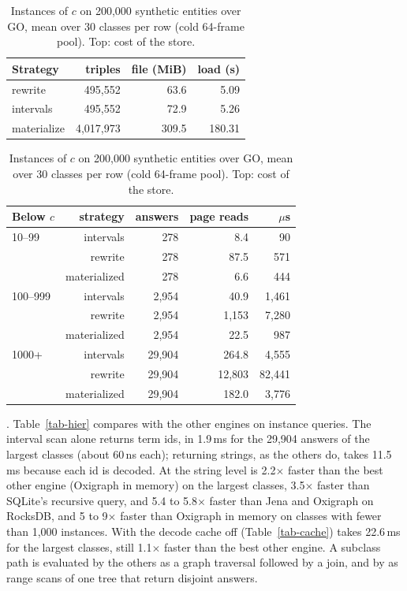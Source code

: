 \begin{table}[t]
\caption{Instances of $c$ on 200,000 synthetic entities over GO, mean over 30 classes per row (cold 64-frame pool). Top: cost of the store.}
\label{tab-types}
\small
\begin{tabular}{@{}lrrr@{}}
\toprule
Strategy & triples & file (MiB) & load (s) \\
\midrule
rewrite & 495,552 & 63.6 & 5.09 \\
intervals & 495,552 & 72.9 & 5.26 \\
materialize & 4,017,973 & 309.5 & 180.31 \\
\bottomrule
\end{tabular}

\medskip
\begin{tabular}{@{}lrrrr@{}}
\toprule
Below $c$ & strategy & answers & page reads & $\mu$s \\
\midrule
10--99 & intervals & 278 & 8.4 & 90 \\
 & rewrite & 278 & 87.5 & 571 \\
 & materialized & 278 & 6.6 & 444 \\
100--999 & intervals & 2,954 & 40.9 & 1,461 \\
 & rewrite & 2,954 & 1,153 & 7,280 \\
 & materialized & 2,954 & 22.5 & 987 \\
1000+ & intervals & 29,904 & 264.8 & 4,555 \\
 & rewrite & 29,904 & 12,803 & 82,441 \\
 & materialized & 29,904 & 182.0 & 3,776 \\
\bottomrule
\end{tabular}
\end{table}

.
Table~\ref{tab-hier} compares \sys with the other engines on instance
queries.
The interval scan alone returns term ids, in 1.9\,ms for the 29,904 answers of
the largest classes (about 60\,ns each); returning strings, as the others do, takes
11.5\,ms because each id is decoded.
At the string level \sys is 2.2$\times$ faster than the best other engine
(Oxigraph in memory) on the largest classes, 3.5$\times$ faster than SQLite's
recursive query, and 5.4 to 5.8$\times$ faster than Jena and Oxigraph on
RocksDB, and 5 to 9$\times$ faster than Oxigraph in memory on classes with
fewer than 1,000 instances.
With the decode cache off (Table~\ref{tab-cache}) \sys takes 22.6\,ms for the
largest classes, still 1.1$\times$ faster than the best other engine.
A subclass path is evaluated by the others as a graph traversal followed by a
join, and by \sys as range scans of one tree that return disjoint answers.

